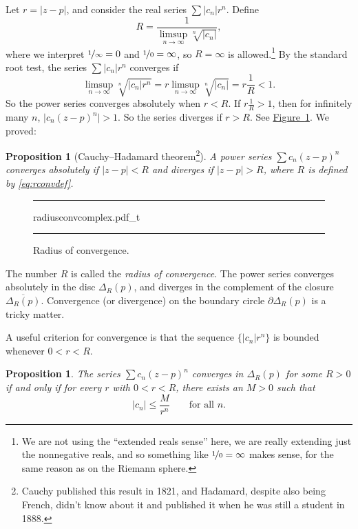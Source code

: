 \documentclass[12pt,openany]{book}
\newcommand{\sabs}[1]{\lvert {#1} \rvert}
\newcommand{\myindex}[1]{#1\index{#1}}
\newcommand{\myquote}[1]{``#1''}
\theoremstyle{plain}
\newtheorem{prop}[thm]{Proposition}
\theoremstyle{remark}
\theoremstyle{definition}
\newenvironment{myfig}{%
\begin{figure}[h!t]
\noindent\rule{\textwidth}{0.5pt}\vspace{12pt}\par\centering}%
{\par\noindent\rule{\textwidth}{0.5pt}
\end{figure}}
\theoremstyle{exercise}
\theoremstyle{example}
\newcommand{\figureref}[1]{\hyperref[#1]{Figure~\ref*{#1}}}
\begin{document}
Let $r = \sabs{z-p}$, and consider the real series $\sum \sabs{c_n} r^n$.  Define
\begin{equation} \label{eq:rconvdef}
R = \frac{1}{\limsup\limits_{n \to \infty} \sqrt[n]{\sabs{c_n}}} ,
\end{equation}
where we interpret $\nicefrac{1}{\infty} = 0$ and $\nicefrac{1}{0} = \infty$,
so $R=\infty$ is allowed.\footnote{%
We are not using the \myquote{extended reals sense} here,
we are really extending just the nonnegative reals, and so
something like $\nicefrac{1}{0}=\infty$ makes sense, for the same
reason as on the Riemann sphere.}
By the standard root test, the series $\sum \sabs{c_n} r^n$
converges if
\begin{equation*}
\limsup_{n \to \infty} \sqrt[n]{\sabs{c_n} r^n} = 
r \limsup_{n \to \infty} \sqrt[n]{\sabs{c_n}} = r \frac{1}{R} < 1 .
\end{equation*}
So the power series converges absolutely when $r < R$.
If $r \frac{1}{R} > 1$, then for infinitely many $n$,
$\sabs{c_n {(z-p)}^n} > 1$. So the series
diverges if $r > R$.
See \figureref{fig:radiusconvcomplex}.
We proved:

\begin{prop}[Cauchy--Hadamard theorem\footnote{%
Cauchy published this result in 1821, and Hadamard, despite also being
French, didn't know about it and published it when he was still a student in 1888.}]
A power series $\sum c_n {(z-p)}^n$ converges absolutely if
$\sabs{z-p} < R$ and diverges if
$\sabs{z-p} > R$, where $R$ is defined by \eqref{eq:rconvdef}.
\end{prop}

\begin{myfig}
{radiusconvcomplex.pdf_t}
\caption{Radius of convergence.\label{fig:radiusconvcomplex}}
\end{myfig}

The number $R$ is called the \emph{\myindex{radius of convergence}}.
The power series converges absolutely
in the disc $\Delta_R(p)$, and diverges
in the complement of the closure $\overline{\Delta_R(p)}$.
Convergence (or divergence) on the boundary circle $\partial \Delta_R(p)$
is a tricky matter.

A useful criterion for convergence is that the sequence
$\bigl\{ \sabs{c_n} r^n \bigr\}$ is
bounded whenever $0 < r < R$.

\begin{prop} \label{prop:cnrnbounded}
The series $\sum c_n {(z-p)}^n$ converges in $\Delta_{R}(p)$ for some
$R > 0$ if and only if
for every $r$ with
$0 < r < R$, there exists an $M > 0$ such that
\begin{equation*}
\sabs{c_n} \leq \frac{M}{r^n} \qquad \text{for all } n .
\end{equation*}
\end{prop}
\end{document}
